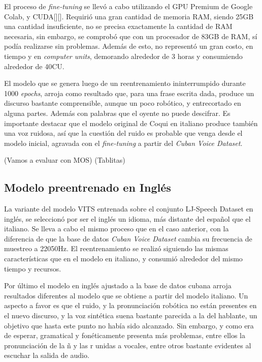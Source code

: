 El proceso de \textit{fine-tuning} se llevó a cabo utilizando el GPU Premium de Google Colab, y CUDA[\cite{cuda}][\cite{cuda1}]. Requirió una gran cantidad de memoria RAM, siendo 25GB una cantidad insuficiente, no se precisa exactamente la cantidad de RAM necesaria, sin embargo, se comprobó que con un procesador de 83GB de RAM, sí podía realizarse sin problemas. Además de esto, no representó un gran costo, en tiempo y en \textit{computer units}, demorando alrededor de 3 horas y consumiendo alrededor de 40CU.

El modelo que se genera luego de un reentrenamiento ininterrumpido durante 1000 \textit{epochs}, arroja como resultado que, para una frase escrita dada, produce un discurso bastante comprensible, aunque un poco robótico, y entrecortado en alguna partes. Además con palabras que el oyente no puede descifrar. Es importante destacar que el modelo original de Coqui en italiano produce también una voz ruidosa, así que la cuestión del ruido es probable que venga desde el modelo inicial, agravada con el \textit{fine-tuning} a partir del \textit{Cuban Voice Dataset}.

(Vamos a evaluar con MOS)
(Tablitas)


\subsection{Modelo preentrenado en Inglés}
La variante del modelo VITS entrenada sobre el conjunto LJ-Speech Dataset en inglés, se seleccionó por ser el inglés un idioma, más distante del español que el italiano. Se lleva a cabo el mismo proceso que en el caso anterior, con la diferencia de que la base de datos \textit{Cuban Voice Dataset} cambia su frecuencia de muestreo a 22050Hz. 
El reentrenamiento se realizó siguiendo las mismas características que en el modelo en italiano, y consumió alrededor del mismo tiempo y recursos.

Por último el modelo en inglés ajustado a la base de datos cubana arroja resultados diferentes al modelo que se obtiene a partir del modelo italiano. Un aspecto a favor es que el ruido, y la pronunciación robótica no están presentes en el nuevo discurso, y la voz sintética suena bastante parecida a la del hablante, un objetivo que hasta este punto no había sido alcanzado. Sin embargo, y como era de esperar, gramatical y fonéticamente presenta más problemas, entre ellos la pronunciación de la ñ y las r unidas a vocales, entre otros bastante evidentes al escuchar la salida de audio.

